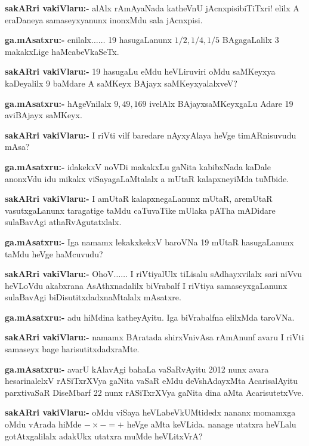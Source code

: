 \smallskip
\noindent
\textbf{sakARri vakiVlaru:-} alAlx rAmAyaNada katheVnU jAcnxpisibiTiTxri! elilx A eraDaneya samaseyxyanunx inonxMdu sala jAcnxpisi.

\smallskip
\noindent
\textbf{ga.mAsatxru:-} enilalx$\ldots\ldots$ {\rm 19} hasugaLanunx $1/2, 1/4, 1/5$ BAgagaLalilx {\rm 3} makakxLige haMcabeVkaSeTx.

\smallskip
\noindent
\textbf{sakARri vakiVlaru:-} {\rm 19} hasugaLu eMdu heVLiruviri oMdu saMKeyxya kaDeyalilx {\rm 9} baMdare A saMKeyx BAjayx saMKeyxyalalxveV?

\smallskip
\noindent
\textbf{ga.mAsatxru:-} hAgeVnilalx $9, 49, 169$ ivelAlx BAjayxsaMKeyxgaLu Adare {\rm 19} aviBAjayx saMKeyx.

\smallskip
\noindent
\textbf{sakARri vakiVlaru:-} I riVti vilf baredare nAyxyAlaya heVge timARnisuvudu mAsa?

\smallskip
\noindent
\textbf{ga.mAsatxru:-} idakekxV noVDi makakxLu gaNita kabibxNada kaDale anonxVdu idu mikakx viSayagaLaMtalalx a mUtaR kalapxneyiMda tuMbide.

\smallskip
\noindent
\textbf{sakARri vakiVlaru:-} I amUtaR kalapxnegaLanunx mUtaR, aremUtaR vasutxgaLanunx taragatige taMdu caTuvaTike mUlaka pATha mADidare sulaBavAgi athaRvAgutatxlalx.

\smallskip
\noindent
\textbf{ga.mAsatxru:-} Iga namamx lekakxkekxV baroVNa {\rm 19} mUtaR hasugaLanunx taMdu heVge haMcuvudu?

\smallskip
\noindent
\textbf{sakARri vakiVlaru:-} OhoV$\ldots\ldots$ I riVtiyalUlx tiLisalu sAdhayxvilalx sari niVvu heVLoVdu akabxrana AsAthxnadalilx biVrabalf I riVtiya samaseyxgaLanunx sulaBavAgi biDisutitxdadxnaMtalalx mAsatxre.

\smallskip
\noindent
\textbf{ga.mAsatxru:-} adu hiMdina katheyAyitu. Iga biVrabalfna elilxMda taroVNa.

\smallskip
\noindent
\textbf{sakARri vakiVlaru:-} namamx BAratada shirxVnivAsa rAmAnunf avaru I riVti samaseyx bage harisutitxdadxraMte.

\smallskip
\noindent
\textbf{ga.mAsatxru:-} avarU kAlavAgi bahaLa vaSaRvAyitu {\rm 2012} nunx avara hesarinalelxV rASiTxrXVya gaNita vaSaR eMdu deVshAdayxMta AcarisalAyitu parxtivaSaR DiseMbarf {\rm 22} nunx rASiTxrXVya gaNita dina aMta AcarisutetxVve.

\smallskip
\noindent
\textbf{sakARri vakiVlaru:-} oMdu viSaya heVLabeVkUMtidedx nananx momamxga oMdu vArada hiMde $-\times -=+$ heVge aMta keVLida. nanage utatxra heVLalu gotAtxgalilalx adakUkx utatxra muMde heVLitxVrA?

